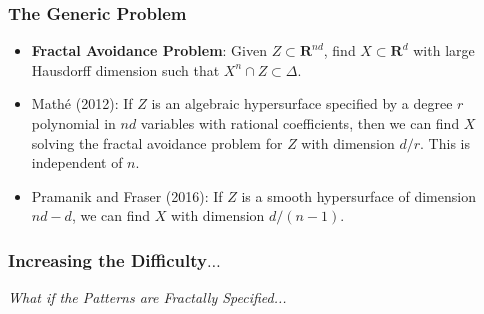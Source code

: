 \documentclass[usenames,dvipsnames]{beamer}
\begin{document}
\begin{frame}
    \frametitle{The Generic Problem}

    \begin{itemize}
        \item {\bf Fractal Avoidance Problem}: Given $Z \subset \mathbf{R}^{nd}$, find $X \subset \mathbf{R}^d$ with large Hausdorff dimension such that $X^n \cap Z \subset \Delta$.

        \item Math\'{e} (2012): If $Z$ is an algebraic hypersurface specified by a degree $r$ polynomial in $nd$ variables with rational coefficients, then we can find $X$ solving the fractal avoidance problem for $Z$ with dimension $d/r$. This is independent of $n$.

        \item Pramanik and Fraser (2016): If $Z$ is a smooth hypersurface of dimension $nd - d$, we can find $X$ with dimension $d/(n-1)$.
    \end{itemize}
\end{frame}

\begin{frame}
    \frametitle{Increasing the Difficulty$\dots$}

    \begin{center}
     \Huge {\it What if the Patterns are Fractally Specified...}
    \end{center}
\end{frame}






\end{document}

